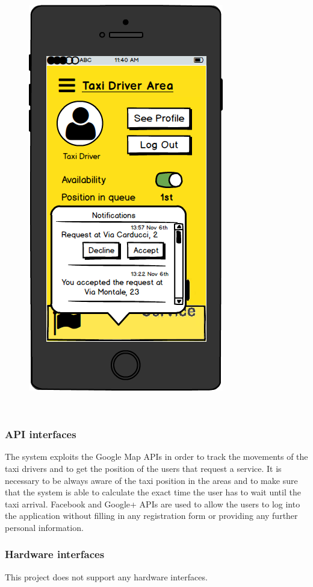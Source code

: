 \documentclass[18pt,oneside,a4paper, titlepage]{article}
\begin{document}
\begin{itemize}
				\begin{figure}[h]
					\centering
					\includegraphics[scale=0.3]{MobileAppTaxiDriverNotifications.png}
				\end{figure}
				\\
			\end{itemize}
\newpage
		\subsubsection{API interfaces}
			The system exploits the Google Map APIs in order to track the movements of the taxi drivers and to get the position of the users that request a service. It is necessary to be always aware of the taxi position in the areas and to make sure that the system is able to calculate the exact time the user has to wait until the taxi arrival. 
			Facebook and Google+ APIs are used to allow the users to log into the application without filling in any registration form or providing any further personal information.
			
		\subsubsection{Hardware interfaces}
			This project does not support any hardware interfaces.
\end{document}
